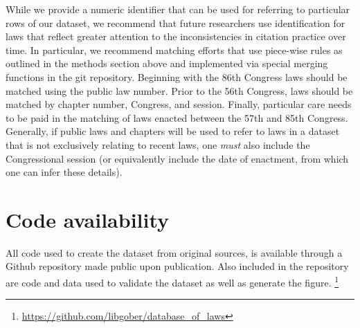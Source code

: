 \documentclass[fleqn,10pt]{wlscirep}
\begin{document}
While we provide a numeric identifier that can be used for referring to particular rows of our dataset, we recommend that future researchers use identification for laws that reflect greater attention to the inconsistencies in citation practice over time. In particular,  we recommend matching efforts that use piece-wise rules as outlined in the methods section above and implemented via special merging functions in the git repository. Beginning with the 86th Congress laws should be matched using the public law number. Prior to the 56th Congress, laws should be matched by chapter number, Congress, and session. Finally, particular care needs to be paid in the matching of laws enacted between the 57th and 85th Congress. Generally, if public laws and chapters will be used to refer to laws in a dataset that is not exclusively relating to recent laws, one \textit{must} also include the Congressional session (or equivalently include the date of enactment, from which one can infer these details). 





\section*{Code availability}

All code used to create the dataset from original sources, is available through a Github repository made public upon publication. Also included in the repository are code and data used to validate the dataset as well as generate the figure. \footnote{\url{https://github.com/libgober/database_of_laws}}
\end{document}
